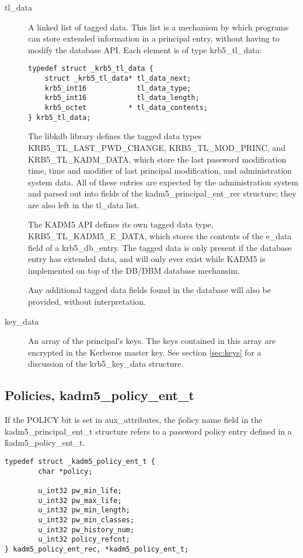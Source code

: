 \begin{description}
\item[tl_data] A linked list of tagged data.  This list is a mechanism
by which programs can store extended information in a principal entry,
without having to modify the database API.  Each element is of type
krb5_tl_data:
\begin{verbatim}
typedef struct _krb5_tl_data {
    struct _krb5_tl_data* tl_data_next;
    krb5_int16            tl_data_type;         
    krb5_int16            tl_data_length;       
    krb5_octet          * tl_data_contents;     
} krb5_tl_data;
\end{verbatim}
The libkdb library defines the tagged data types
KRB5_TL_LAST_PWD_CHANGE, KRB5_TL_MOD_PRINC, and KRB5_TL_KADM_DATA,
which store the last password modification time, time and modifier of
last principal modification, and administration system data.  All of
these entries are expected by the administration system and parsed out
into fields of the kadm5_principal_ent_rec structure; they are also
left in the tl_data list.

The KADM5 API defines its own tagged data type, KRB5_TL_KADM5_E_DATA,
which stores the contents of the e_data field of a krb5_db_entry.  The
tagged data is only present if the database entry has extended data,
and will only ever exist while KADM5 is implemented on top of the
DB/DBM database mechansim.

Any additional tagged data fields found in the database will also be
provided, without interpretation.

\item[key_data] An array of the principal's keys.  The keys contained
in this array are encrypted in the Kerberos master key.  See section
\ref{sec:keys} for a discussion of the krb5_key_data structure.
\end{description}

\subsection{Policies, kadm5_policy_ent_t}
\label{sec:policy-fields}

If the POLICY bit is set in aux_attributes, the \v{policy} name field
in the kadm5_principal_ent_t structure refers to a password policy
entry defined in a \v{kadm5_policy_ent_t}.

\begin{verbatim}
typedef struct _kadm5_policy_ent_t {
        char *policy;

        u_int32 pw_min_life;
        u_int32 pw_max_life;
        u_int32 pw_min_length;
        u_int32 pw_min_classes;
        u_int32 pw_history_num;
        u_int32 policy_refcnt;
} kadm5_policy_ent_rec, *kadm5_policy_ent_t;
\end{verbatim}

